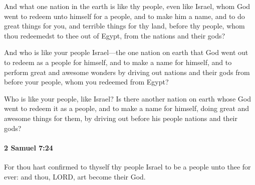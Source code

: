 			\begin{versebox}
					\item[BHS] 
					\item[ASV] And what one nation in the earth is like thy people, even like Israel, whom God went to redeem unto himself for a people, and to make him a name, and to do great things for you, and terrible things for thy land, before thy people, whom thou redeemedst to thee out of Egypt, from the nations and their gods?
					\item[NIV] And who is like your people Israel—the one nation on earth that God went out to redeem as a people for himself, and to make a name for himself, and to perform great and awesome wonders by driving out nations and their gods from before your people, whom you redeemed from Egypt?
					\item[NRSV] Who is like your people, like Israel? Is there another nation on earth whose God went to redeem it as a people, and to make a name for himself, doing great and awesome things for them, by driving out before his people nations and their gods?
			\end{versebox}

		\paragraph{2 Samuel 7:24} %
			\label{2SAMUEL-7-24}

			For thou hast confirmed to thyself thy people Israel to be a people unto thee for ever: and thou, LORD, art become their God.


